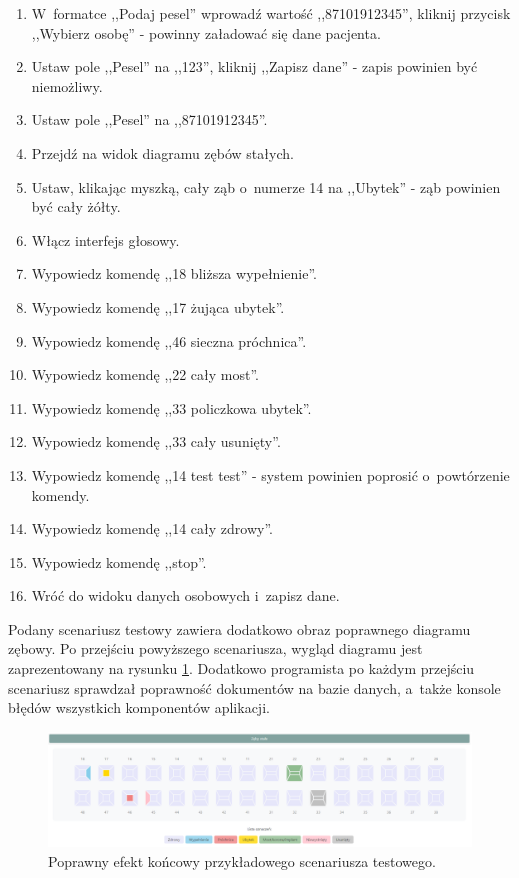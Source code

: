 \begin{enumerate}
    \item W~formatce ,,Podaj pesel'' wprowadź wartość ,,87101912345'', kliknij przycisk ,,Wybierz osobę'' - powinny załadować się dane pacjenta.
    \item Ustaw pole ,,Pesel'' na ,,123'', kliknij ,,Zapisz dane'' - zapis powinien być niemożliwy.
    \item Ustaw pole ,,Pesel'' na ,,87101912345''.
    \item Przejdź na widok diagramu zębów stałych.
    \item Ustaw, klikając myszką, cały ząb o~numerze 14 na ,,Ubytek'' - ząb powinien być cały żółty.
    \item Włącz interfejs głosowy.
    \item Wypowiedz komendę ,,18 bliższa wypełnienie''.
    \item Wypowiedz komendę ,,17 żująca ubytek''.
    \item Wypowiedz komendę ,,46 sieczna próchnica''.
    \item Wypowiedz komendę ,,22 cały most''.
    \item Wypowiedz komendę ,,33 policzkowa ubytek''.
    \item Wypowiedz komendę ,,33 cały usunięty''.
    \item Wypowiedz komendę ,,14 test test'' - system powinien poprosić o~powtórzenie komendy.
    \item Wypowiedz komendę ,,14 cały zdrowy''.
    \item Wypowiedz komendę ,,stop''.
    \item Wróć do widoku danych osobowych i~zapisz dane.
\end{enumerate}
    Podany scenariusz testowy zawiera dodatkowo obraz poprawnego diagramu zębowy. Po przejściu powyższego scenariusza, wygląd diagramu jest zaprezentowany na rysunku \ref{fig:zebyTest}. Dodatkowo programista po każdym przejściu scenariusz sprawdzał poprawność dokumentów na bazie danych, a~także konsole błędów wszystkich komponentów aplikacji.
        \begin{figure}[ht!]
    \centering\includegraphics[width=145mm,scale=1.5]{figures/zebyTest.PNG}
    \caption{Poprawny efekt końcowy przykładowego scenariusza testowego.}
    \label{fig:zebyTest}
    \end{figure}

